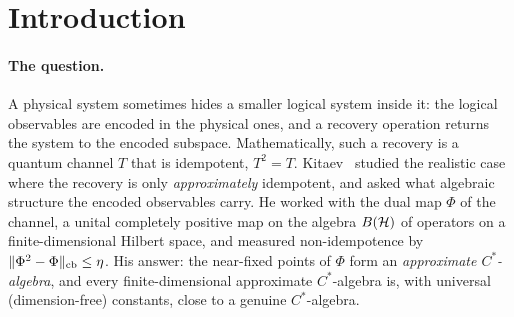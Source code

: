\section{Introduction}\label{sec:intro}

\paragraph{The question.}
A physical system sometimes hides a smaller logical system inside it: the
logical observables are encoded in the physical ones, and a recovery operation
returns the system to the encoded subspace. Mathematically, such a recovery is a
quantum channel $T$ that is idempotent, $T^2=T$. Kitaev~\cite{Kitaev2024} studied
the realistic case where the recovery is only \emph{approximately} idempotent,
and asked what algebraic structure the encoded observables carry. He worked with
the dual map $\Phi$ of the channel, a unital completely positive map on the
algebra $B(\mathcal{H})$ of operators on a finite-dimensional Hilbert space, and measured
non-idempotence by $\lVert \Phi^2-\Phi \rVert_{\mathrm{cb}}\le\eta$. His answer: the
near-fixed points of $\Phi$ form an \emph{approximate $C^*$-algebra}, and every
finite-dimensional approximate $C^*$-algebra is, with universal (dimension-free)
constants, close to a genuine $C^*$-algebra.

